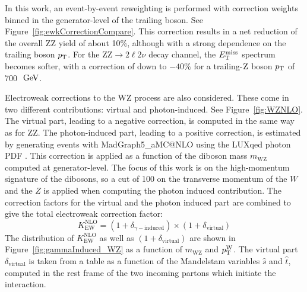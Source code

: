 In this work, an event-by-event reweighting is performed with correction weights
binned in the generator-level \pt of the trailing boson. See Figure~\ref{fig:ewkCorrectionCompare}.
This correction results in a net reduction of the overall ZZ yield of about 10\%,
although with a strong dependence on the trailing boson $p_{\mathrm{T}}$.
For the $\mathrm{ZZ}\rightarrow 2\ell 2 \nu$ decay channel, the $E_\mathrm{T}^{\mathrm{miss}}$ spectrum becomes softer,
with a correction of down to $-40\%$ for a trailing-$\mathrm{Z}$ boson $p_{\mathrm{T}}$ of 700~$\,\text{Ge\hspace{-.08em}V}$. 

Electroweak corrections to the WZ process are also considered. 
These come in two different contributions: virtual and photon-induced. See Figure~\ref{fig:WZNLO}. 
The virtual part, leading to a negative correction, is computed in the same way as for ZZ. 
The photon-induced part, leading to a positive correction, 
is estimated by generating events with MadGraph5\_aMC@NLO 
using the LUXqed photon PDF \cite{Manohar:2016nzj}.
This correction is applied as a function of the diboson mass $m_\mathrm{WZ}$ computed at generator-level.
The focus of this work is on the high-momentum signature of the dibosons,
so a cut of 100 \GeV on the transverse momentum of the $W$ and the $Z$ is applied
when computing the photon induced contribution.
The correction factors for the virtual and the photon induced part are combined to give the total electroweak correction factor:
\begin{equation}
K^\mathrm{NLO}_\mathrm{EW} = (1 + \delta_{\gamma - \mathrm{induced}}) \times (1 + \delta_\mathrm{virtual})
\end{equation}
The distribution of $K^\mathrm{NLO}_\mathrm{EW}$ as well as $(1 + \delta_\mathrm{virtual})$ are shown
in Figure~\ref{fig:gammaInduced_WZ} as a function of $m_\mathrm{WZ}$ and $p_\mathrm{T}^{\mathrm{W}}$.
The virtual part $\delta_\mathrm{virtual}$ is taken from a table as a function of the Mandelstam variables $\hat{s}$ and $\hat{t}$, computed in the rest frame of the two incoming partons which initiate the interaction.

